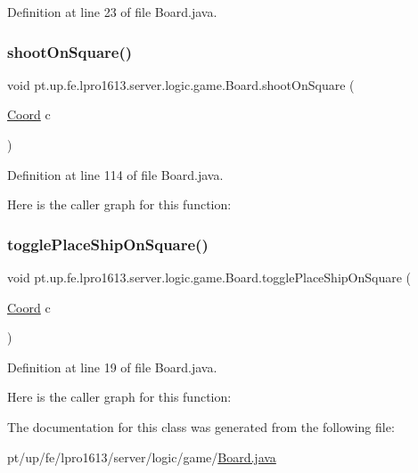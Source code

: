 Definition at line 23 of file Board.\+java.

\hypertarget{classpt_1_1up_1_1fe_1_1lpro1613_1_1server_1_1logic_1_1game_1_1_board_afb97d92e700f1eda19c74c609b2f8bf9}{}\label{classpt_1_1up_1_1fe_1_1lpro1613_1_1server_1_1logic_1_1game_1_1_board_afb97d92e700f1eda19c74c609b2f8bf9} 
\subsubsection{\texorpdfstring{shoot\+On\+Square()}{shootOnSquare()}}
{\footnotesize\ttfamily void pt.\+up.\+fe.\+lpro1613.\+server.\+logic.\+game.\+Board.\+shoot\+On\+Square (\begin{DoxyParamCaption}\item[{\hyperlink{classpt_1_1up_1_1fe_1_1lpro1613_1_1sharedlib_1_1utils_1_1_coord}{Coord}}]{c }\end{DoxyParamCaption})}



Definition at line 114 of file Board.\+java.

Here is the caller graph for this function\+:
\hypertarget{classpt_1_1up_1_1fe_1_1lpro1613_1_1server_1_1logic_1_1game_1_1_board_a494fc0dd022bb909054efeb930add9ee}{}\label{classpt_1_1up_1_1fe_1_1lpro1613_1_1server_1_1logic_1_1game_1_1_board_a494fc0dd022bb909054efeb930add9ee} 
\subsubsection{\texorpdfstring{toggle\+Place\+Ship\+On\+Square()}{togglePlaceShipOnSquare()}}
{\footnotesize\ttfamily void pt.\+up.\+fe.\+lpro1613.\+server.\+logic.\+game.\+Board.\+toggle\+Place\+Ship\+On\+Square (\begin{DoxyParamCaption}\item[{\hyperlink{classpt_1_1up_1_1fe_1_1lpro1613_1_1sharedlib_1_1utils_1_1_coord}{Coord}}]{c }\end{DoxyParamCaption})}



Definition at line 19 of file Board.\+java.

Here is the caller graph for this function\+:


The documentation for this class was generated from the following file\+:\begin{DoxyCompactItemize}
\item 
pt/up/fe/lpro1613/server/logic/game/\hyperlink{_board_8java}{Board.\+java}\end{DoxyCompactItemize}
